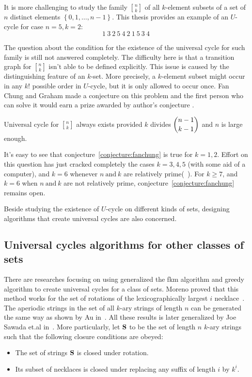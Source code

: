 It is more challenging to study the family ${n \brack k}$ of all $k$-element subsets of a set of $n$ distinct elements $\left\{0,1,\ldots,n-1\right\}$. This thesis provides an example of an $U$-cycle for case $n=5,k=2$:
\[1\ 3\ 2\ 5\ 4\ 2\ 1\ 5\ 3\ 4\]

The question about the condition for the existence of the universal cycle for such family is still not answered completely. The difficulty here is that a transition graph for ${n \brack k}$ isn't able to be defined explicitly. This issue is caused by the distinguishing feature of an $k$-set. More precisely, a $k$-element subset might occur in any $k!$ possible order in $U$-cycle, but it is only allowed to occur once. Fan Chung and Graham made a conjecture on this problem and the first person who can solve it would earn a prize awarded by author's conjecture .

\begin{conjecture}\label{conjecture:fanchung}
    Universal cycle for ${n \brack k}$ always exists provided $k$ divides $\dbinom{n-1}{k-1}$ and $n$ is large enough.
\end{conjecture}

It's easy to see that conjecture~\ref{conjecture:fanchung} is true for $k=1,2$. Effort on this question has just cracked completely the cases $k=3,4,5$ (with some aid of a computer), and $k=6$ whenever $n\ \mathrm{and}\ k$ are relatively prime(~\cite{hurlbert1994universal,jackson1993universal}). For $k\geq 7$, and $k=6$ when $n\ \mathrm{and}\ k$ are not relatively prime, conjecture~\ref{conjecture:fanchung} remains open. 

Beside studying the existence of $U$-cycle on different kinds of sets, designing algorithms that create universal cycles are also concerned.
\subsection{Universal cycles algorithms for other classes of sets}
There are researches focusing on using generalized the \gls{fkm} algorithm and greedy algorithm to create universal cycles for a class of sets. Moreno proved that this method works for the set of rotations of the lexicographically largest $i$ necklace~\cite{moreno2004theorem}. The aperiodic strings in the set of all $k$-ary strings of length $n$ can be generated the same way as shown by Au in~\cite{au2015generalized}. All these results is later generalized by Joe Sawada et.al in~\cite{sawada2016generalizing}. More particularly, let ${\mathbf S}$ to be the set of length $n$ $k$-ary strings such that the following closure conditions are obeyed:
\begin{itemize}
    \item The set of strings ${\mathbf S}$ is closed under rotation.
    \item Its subset of necklaces is closed under replacing any suffix of length $i$ by $k^i$. 
\end{itemize}

